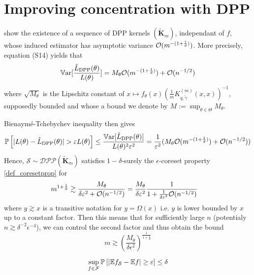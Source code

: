 \section{Improving concentration with DPP}

\cite{bardenet2021sgddpp} show the existence of a sequence of DPP kernels $(\tilde{\boldsymbol K}_m)$, independant of $f$, whose induced estimator has asymptotic variance $\mathcal{O}( m ^{-(1+\frac 1 d)})$. More precisely, 	
equation (S14) yields that 
\begin{equation}
	\operatorname{\mathbb V ar}[\frac{\hat L_{\textrm{DPP}}(\theta)}{L(\theta)}] = M_\theta \mathcal{O}( m ^{-(1+\frac 1 d)}) +\mathcal{O}( n^{-1/2})
\end{equation}
where $\sqrt{M_\theta}$ is the Lipschitz constant of $x \mapsto f_\theta(x) (\frac{1}{m} K^{(m)}_{q, \tilde \gamma}(x,x))^{-1}$, supposedly bounded and whose a bound we denote by $M := \sup_{\theta \in \Theta}M_\theta$.

Bienaym\'e-Tchebychev inequality then gives
\begin{equation}
	\PP \left[|L(\theta)-\hat L_{\textrm{DPP}}(\theta)|>\epsilon L(\theta)\right] \leq \frac{\Var[ \hat L_{\textrm{DPP}}(\theta) ] }{L(\theta)^{2}\varepsilon ^{2}} = \frac {1} {\epsilon^2}(M_\theta \OO( m ^{-(1+\frac 1 d)}) + \OO( n^{-1/2}))
\end{equation}
Hence, $\mathcal{S} \sim \mathcal{DPP}(\tilde{\boldsymbol K}_m)$ satisfies $1-\delta$-surely the $\epsilon$-coreset property \ref{def_coresetprop} for
\begin{align}
	m^{1+\frac 1 d} &\gtrsim \frac{M_\theta}{\delta \varepsilon^2 + \mathcal{O}(n^{-1/2})} = \frac {M_\theta} {\delta\varepsilon^2} \frac{1}{1 + \frac{1}{\delta \varepsilon^2}\mathcal{O}(n^{-1/2})}
\end{align} 
where $y \gtrsim x$ is a transitive notation for $y = \Omega(x)$ i.e. $y$ is lower bounded by $x$ up to a constant factor.
Then this means that for sufficiently large $n$ (potentialy $n\gtrsim \delta^{-2} \epsilon^{-4}$), we can control the second factor and thus obtain the bound
\begin{equation}
	\boxed{m \gtrsim \left(\frac{M_\theta}{\delta\epsilon^2} \right)^{\frac{1}{1+\frac 1 d}} }
	\label{eqn_fixedtheta}
\end{equation}
\begin{lemma}
	\begin{equation}
		\sup_{f \in \mathcal{F}} \mathbb{P}_{}\left[\lvert \mathbb{E}{f_{\mathcal{S}}} - \mathbb{E}{f} \rvert \geq \varepsilon\right] \leq \delta
	\end{equation}
\end{lemma}


